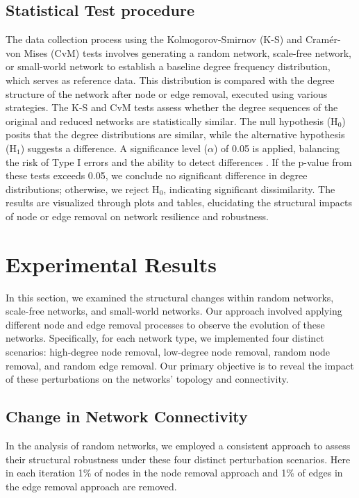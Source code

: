 \documentclass[conference]{IEEEtran} %
\begin{document}
\subsection{Statistical Test procedure}
The data collection process using the Kolmogorov-Smirnov (K-S) and Cramér-von Mises (CvM) tests involves generating a random network, scale-free network, or small-world network to establish a baseline degree frequency distribution, which serves as reference data. This distribution is compared with the degree structure of the network after node or edge removal, executed using various strategies. The K-S and CvM tests assess whether the degree sequences of the original and reduced networks are statistically similar. The null hypothesis (H$_0$) posits that the degree distributions are similar, while the alternative hypothesis (H$_1$) suggests a difference. A significance level ($\alpha$) of 0.05 is applied, balancing the risk of Type I errors and the ability to detect differences \cite{newman2003structure}. If the p-value from these tests exceeds 0.05, we conclude no significant difference in degree distributions; otherwise, we reject H$_0$, indicating significant dissimilarity. The results are visualized through plots and tables, elucidating the structural impacts of node or edge removal on network resilience and robustness.

\section{Experimental Results}


In this section, we examined the structural changes within random networks, scale-free networks, and small-world networks. Our approach involved applying different node and edge removal processes to observe the evolution of these networks. Specifically, for each network type, we implemented four distinct scenarios: high-degree node removal, low-degree node removal, random node removal, and random edge removal. Our primary objective is to reveal the impact of these perturbations on the networks' topology and connectivity.

\subsection{Change in Network Connectivity}

In the analysis of random networks, we employed a consistent approach to assess their structural robustness under these four distinct perturbation scenarios. Here in each iteration 1\% of nodes in the node removal approach and 1\% of edges in the edge removal approach are removed.
\end{document}
